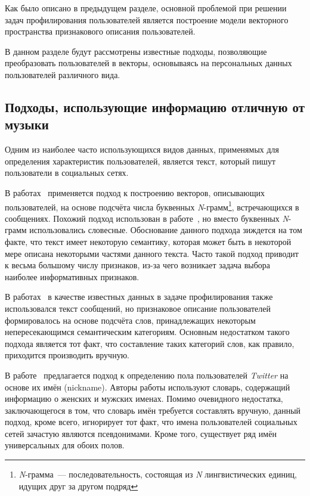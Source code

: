 Как было описано в предыдущем разделе, основной проблемой при решении
задач профилирования пользователей является построение модели
векторного пространства признакового описания пользователей.

В данном разделе будут рассмотрены известные подходы,
позволяющие преобразовать пользователей в векторы, основываясь
на персональных данных пользователей различного вида.

\subsection{Подходы, использующие информацию отличную от музыки}
\label{ssec:without_music}

Одним из наиболее часто использующихся видов данных, применямых
для определения характеристик пользователей, является текст, который
пишут пользователи в социальных сетях. 

В работах~\cite{miller2012gender,deitrick2012gender} применяется
подход к построению векторов, описывающих пользователей, на основе подсчёта
числа буквенных \textit{N}-грамм\footnote{\textit{N}-грамма~--- 
последовательность, состоящая из \textit{N} лингвистических единиц,
идущих друг за другом подряд}, встречающихся в сообщениях. Похожий
подход использован в работе~\cite{turdakov2013opredelenie}, но
вместо буквенных \textit{N}-грамм использовались словесные. Обоснование
данного подхода зиждется на том факте, что текст имеет некоторую
семантику, которая может быть в некоторой мере описана некоторыми
частями данного текста. Часто такой подход приводит к весьма большому
числу признаков, из-за чего возникает задача выбора наиболее
информативных признаков.

В работах~\cite{rosenthal2011age,schwartz2013personality} в качестве
известных данных в задаче профилирования также
использовался текст сообщений, но признаковое описание пользователей
формировалось на основе подсчёта слов, принадлежащих некоторым
непересекающимся семантическим категориям. Основным недостатком такого подхода
является тот факт, что составление таких категорий слов, как правило,
приходится производить вручную.

В работе~\cite{sloan2013knowing} предлагается подход к определению
пола пользователей \textit{Twitter} на основе их имён (nickname).
Авторы работы используют словарь, содержащий информацию о женских и мужских
именах. Помимо очевидного недостатка, заключающегося в том, что
словарь имён требуется составлять вручную, данный подход, кроме всего,
игнорирует тот факт, что имена пользователей социальных сетей зачастую
являются псевдонимами. Кроме того, существует ряд имён универсальных
для обоих полов.

